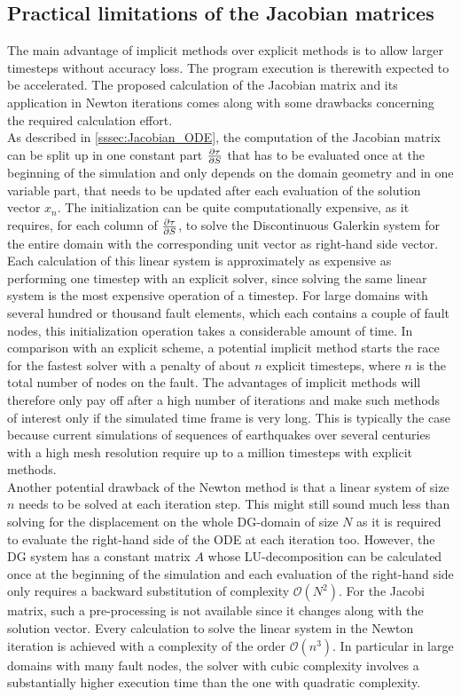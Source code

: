 \subsection{Practical limitations of the Jacobian matrices}
The main advantage of implicit methods over explicit methods is to allow larger timesteps without accuracy loss. The program execution is therewith expected to be accelerated. The proposed calculation of the Jacobian matrix and its application in Newton iterations comes along with some drawbacks concerning the required calculation effort. \\
As described in \autoref{sssec:Jacobian_ODE}, the computation of the Jacobian matrix can be split up in one constant part $\pdv{\tau}{S}$ that has to be evaluated once at the beginning of the simulation and only depends on the domain geometry and in one variable part, that needs to be updated after each evaluation of the solution vector $x_n$. The initialization can be quite computationally expensive, as it requires, for each column of $\pdv{\tau}{S}$, to solve the Discontinuous Galerkin system for the entire domain with the corresponding unit vector as right-hand side vector. Each calculation of this linear system is approximately as expensive as performing one timestep with an explicit solver, since solving the same linear system is the most expensive operation of a timestep. For large domains with several hundred or thousand fault elements, which each contains a couple of fault nodes, this initialization operation takes a considerable amount of time. In comparison with an explicit scheme, a potential implicit method starts the race for the fastest solver with a penalty of about $n$ explicit timesteps, where $n$ is the total number of nodes on the fault. The advantages of implicit methods will therefore only pay off after a high number of iterations and make such methods of interest only if the simulated time frame is very long. This is typically the case because current simulations of sequences of earthquakes over several centuries with a high mesh resolution require up to a million timesteps with explicit methods. \\
Another potential drawback of the Newton method is that a linear system of size $n$ needs to be solved at each iteration step. This might still sound much less than solving for the displacement on the whole DG-domain of size $N$ as it is required to evaluate the right-hand side of the ODE at each iteration too. However, the DG system has a constant matrix $A$ whose LU-decomposition can be calculated once at the beginning of the simulation and each evaluation of the right-hand side only requires a backward substitution of complexity $\mathcal{O}\left(N^2\right)$. For the Jacobi matrix, such a pre-processing is not available since it changes along with the solution vector. Every calculation to solve the linear system in the Newton iteration is achieved with a complexity of the order $\mathcal{O}\left(n^3\right)$. In particular in large domains with many fault nodes, the solver with cubic complexity involves a substantially higher execution time than the one with quadratic complexity. 

